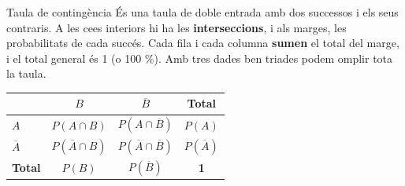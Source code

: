 \documentclass[11pt,a4paper]{article}
\begin{document}
  
\begin{fmdef}{Taula de contingència}
És una taula de doble entrada amb dos successos i els seus contraris. A les ce\lgem{}es interiors hi ha les \textbf{interseccions}, i als marges, les probabilitats de cada succés. Cada fila i cada columna \textbf{sumen} el total del marge, i el total general és 1 (o 100 \%). Amb tres dades ben triades podem omplir tota la taula.

      
\begin{center}\renewcommand{\arraystretch}{1.55}\setlength{\tabcolsep}{9pt}\begin{tabular}{l|cc|c}\toprule
\textbf{} & \textbf{$B$} & \textbf{$\overline{B}$} & \textbf{Total}\\\midrule
\textbf{$A$} & $P(A\cap B)$ & $P(A\cap\overline{B})$ & \textbf{$P(A)$}\\
\textbf{$\overline{A}$} & $P(\overline{A}\cap B)$ & $P(\overline{A}\cap\overline{B})$ & \textbf{$P(\overline{A})$}\\
\midrule\textbf{Total} & \textbf{$P(B)$} & \textbf{$P(\overline{B})$} & \textbf{1}\\
\bottomrule\end{tabular}\end{center}
\end{fmdef}
\end{document}
